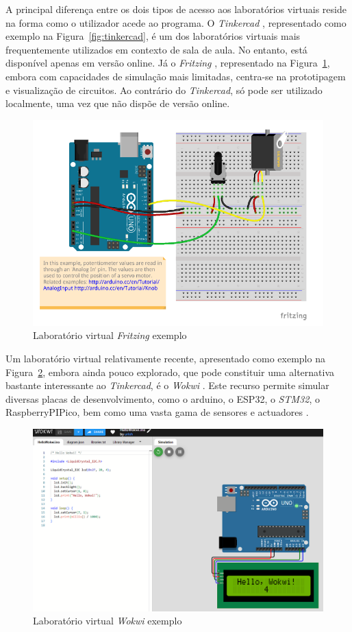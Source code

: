 A principal diferença entre os dois tipos de acesso aos laboratórios virtuais reside na forma como o utilizador acede ao programa. O \textit{Tinkercad} \cite{tinkercad}, representado como exemplo na Figura~\ref{fig:tinkercad}, é um dos laboratórios virtuais mais frequentemente utilizados em contexto de sala de aula. No entanto, está disponível apenas em versão online. Já o \textit{Fritzing} \cite{fritzingdown}, representado na Figura~\ref{fig:fritzing}, embora com capacidades de simulação mais limitadas, centra-se na prototipagem e visualização de circuitos. Ao contrário do \textit{Tinkercad}, só pode ser utilizado localmente, uma vez que não dispõe de versão online.

\begin{figure}[hbtp]
    \centering
    \includegraphics[width=0.6\linewidth]{figures/fritzing.png}
    \caption{Laboratório virtual \textit{Fritzing} exemplo}
    \label{fig:fritzing}
\end{figure}

Um laboratório virtual relativamente recente, apresentado como exemplo na Figura~\ref{fig:wokwi}, embora ainda pouco explorado, que pode constituir uma alternativa bastante interessante ao \textit{Tinkercad}, é o \textit{Wokwi} \cite{wokwi}. Este recurso permite simular diversas placas de desenvolvimento, como o \gls{arduino}, o \gls{ESP32}, o \textit{STM32}, o \gls{RaspberryPI}Pico, bem como uma vasta gama de sensores e actuadores \cite{wokwi}.

\begin{figure}[hbtp]
    \centering
    \includegraphics[width=0.6\linewidth]{figures/wokwi.png}
    \caption{Laboratório virtual \textit{Wokwi} exemplo}
    \label{fig:wokwi}
\end{figure}

